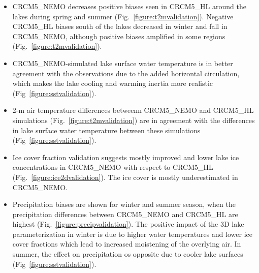 \documentclass[a0b,landscape]{a0poster}
\begin{document}
\begin{multicols*}{4}
\begin{itemize}
    \item CRCM5\_NEMO decreases positive biases seen in CRCM5\_HL around the lakes during spring and summer (Fig.~\ref{figure:t2mvalidation}).
    Negative CRCM5\_HL biases south of the lakes decreased in winter and fall in CRCM5\_NEMO, although positive biases amplified in some regions (Fig.~\ref{figure:t2mvalidation}).
    \item CRCM5\_NEMO-simulated lake surface water temperature is in better agreement with
          the observations due to the added horizontal circulation, which makes the lake
          cooling and warming inertia more realistic (Fig~\ref{figure:sstvalidation}).
    \item 2-m air temperature differences betweenn CRCM5\_NEMO and
          CRCM5\_HL simulations (Fig.~\ref{figure:t2mvalidation}) are in agreement with the
          differences in lake surface water temperature between these simulations
          (Fig~\ref{figure:sstvalidation}).
\end{itemize}


%
\hfill
%

\begin{itemize}
  \item Ice cover fraction validation suggests mostly improved and lower lake ice concentrations in CRCM5\_NEMO with respect to CRCM5\_HL (Fig.~\ref{figure:ice2dvalidation}).
  The ice cover is mostly underestimated in CRCM5\_NEMO.
  \item Precipitation biases are shown for winter and summer season, when the precipitation differences between CRCM5\_NEMO and CRCM5\_HL are highest (Fig.~\ref{figure:precipvalidation}).
  The positive impact of the 3D lake parameterization in winter is due to higher water temperatures and lower ice cover fractions which lead to increased moistening of the overlying air.
  In summer, the effect on precipitation os opposite due to cooler lake surfaces (Fig~\ref{figure:sstvalidation}).
\end{itemize}





\end{multicols*}
\end{document}
